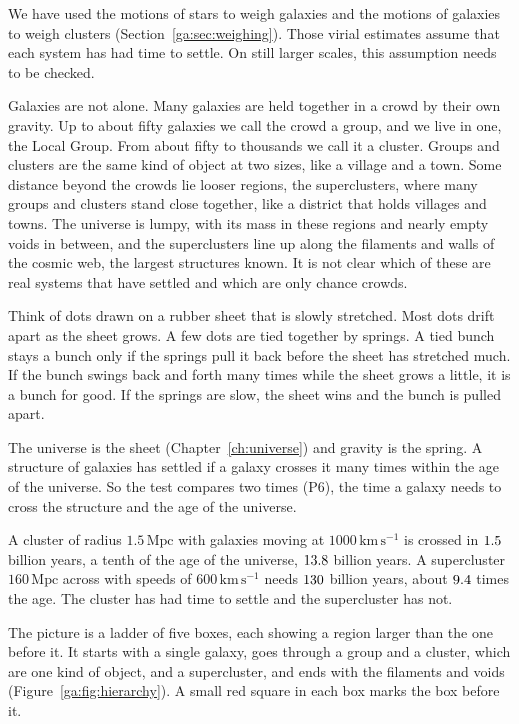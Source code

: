 We have used the motions of stars to weigh galaxies and the motions of galaxies to weigh clusters (Section~\ref{ga:sec:weighing}). Those virial estimates assume that each system has had time to settle. On still larger scales, this assumption needs to be checked.

Galaxies are not alone. Many galaxies are held together in a crowd by their own gravity. Up to about fifty galaxies we call the crowd a group, and we live in one, the Local Group. From about fifty to thousands we call it a cluster. Groups and clusters are the same kind of object at two sizes, like a village and a town. Some distance beyond the crowds lie looser regions, the superclusters, where many groups and clusters stand close together, like a district that holds villages and towns. The universe is lumpy, with its mass in these regions and nearly empty voids in between, and the superclusters line up along the filaments and walls of the cosmic web, the largest structures known. It is not clear which of these are real systems that have settled and which are only chance crowds.

Think of dots drawn on a rubber sheet that is slowly stretched. Most dots drift apart as the sheet grows. A few dots are tied together by springs. A tied bunch stays a bunch only if the springs pull it back before the sheet has stretched much. If the bunch swings back and forth many times while the sheet grows a little, it is a bunch for good. If the springs are slow, the sheet wins and the bunch is pulled apart.

The universe is the sheet (Chapter~\ref{ch:universe}) and gravity is the spring. A structure of galaxies has settled if a galaxy crosses it many times within the age of the universe. So the test compares two times (P6), the time a galaxy needs to cross the structure and the age of the universe.

A cluster of radius $1.5\,\mathrm{Mpc}$ with galaxies moving at $1000\,\mathrm{km\,s^{-1}}$ is crossed in $1.5$ billion years, a tenth of the age of the universe, $13.8$ billion years. A supercluster $160\,\mathrm{Mpc}$ across with speeds of $600\,\mathrm{km\,s^{-1}}$ needs $130$ billion years, about $9.4$ times the age. The cluster has had time to settle and the supercluster has not.

The picture is a ladder of five boxes, each showing a region larger than the one before it. It starts with a single galaxy, goes through a group and a cluster, which are one kind of object, and a supercluster, and ends with the filaments and voids (Figure~\ref{ga:fig:hierarchy}). A small red square in each box marks the box before it.

